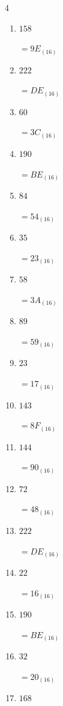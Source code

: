 \begin{multicols}{4}
\begin{enumerate}
  \item $158$

        $=9E_{(16)}$

  \item $222$

        $=DE_{(16)}$

  \item $60$

        $=3C_{(16)}$

  \item $190$

        $=BE_{(16)}$

  \item $84$

        $=54_{(16)}$

  \item $35$

        $=23_{(16)}$

  \item $58$

        $=3A_{(16)}$

  \item $89$

        $=59_{(16)}$

  \item $23$

        $=17_{(16)}$

  \item $143$

        $=8F_{(16)}$

  \item $144$

        $=90_{(16)}$

  \item $72$

        $=48_{(16)}$

  \item $222$

        $=DE_{(16)}$

  \item $22$

        $=16_{(16)}$

\columnbreak %

  \item $190$

        $=BE_{(16)}$

  \item $32$

        $=20_{(16)}$

  \item $168$


\end{enumerate}
\end{multicols}
